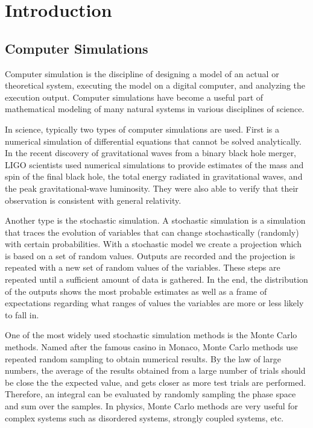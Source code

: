 \chapter{Introduction}
\section{Computer Simulations}
Computer simulation is the discipline of designing a model of an actual or 
theoretical system, executing the model on a digital computer, and 
analyzing the execution output. Computer simulations have become a useful part of mathematical modeling of 
many natural systems in various disciplines of science. 

In science, typically two types of computer simulations are used. First is a 
numerical simulation of differential equations that cannot be solved 
analytically. In the recent discovery of gravitational waves from a binary
black hole merger, LIGO scientists used numerical simulations to provide 
estimates of the mass and spin of the final black hole, the total energy 
radiated in gravitational waves, and the peak gravitational-wave luminosity.
They were also able to verify that their observation is consistent with general 
relativity.

Another type is the stochastic simulation. A stochastic simulation is a 
simulation that traces the evolution of variables that can change stochastically
 (randomly) with certain probabilities. With a stochastic model we create a 
projection which is based on a set of  random values. 
Outputs are recorded and the projection is repeated with a new 
set of random values of the variables. These steps are repeated until a 
sufficient amount of data is gathered. In the end, the distribution of the 
outputs shows the most probable estimates as well as a frame of expectations 
regarding what ranges of values the variables are more or less likely to fall 
in. 

One of the most widely used stochastic simulation methods is the Monte Carlo
methods. Named after the famous casino in Monaco, Monte Carlo methods use
repeated random sampling to obtain numerical results. By the law of large 
numbers, the average of the results obtained from a large number of trials
should be close the the expected value, and gets closer as more test trials
are performed. Therefore, an integral can be evaluated by randomly sampling
the phase space and sum over the samples. 
In physics, Monte Carlo methods are very useful for complex systems such as 
disordered systems, strongly coupled systems, etc. 

